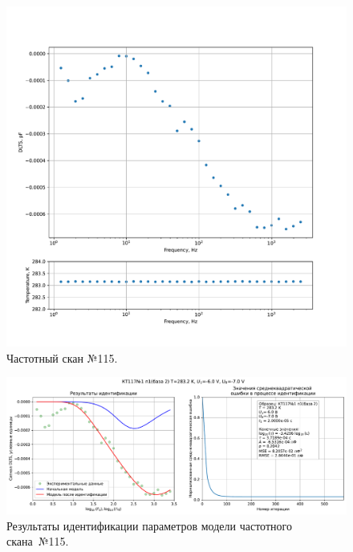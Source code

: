 \begin{figure}[!ht]
    \centering
    \includegraphics[width=1\textwidth]{../plots/КТ117№1_п1(база 2)_2500Гц-1Гц_1пФ_+10С_-6В-7В_10мВ_20мкс_шаг_0,1.pdf}
    \caption{Частотный скан №115.}
    \label{pic:frequency_scan_115}
\end{figure}

\begin{figure}[!ht]
    \centering
    \includegraphics[width=1\textwidth]{../plots/КТ117№1_п1(база 2)_2500Гц-1Гц_1пФ_+10С_-6В-7В_10мВ_20мкс_шаг_0,1_model.pdf}
    \caption{Результаты идентификации параметров модели частотного скана~№115.}
    \label{pic:frequency_scan_model115}
\end{figure}

\pagebreak


